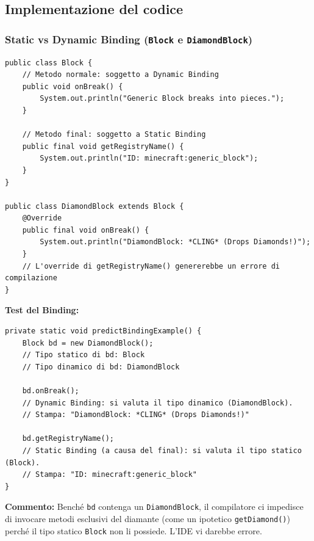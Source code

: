 \documentclass[12pt, a4paper]{article}
\begin{document}
\subsection{Implementazione del codice}

\subsubsection{Static vs Dynamic Binding (\texttt{Block} e \texttt{DiamondBlock})}
\begin{verbatim}
public class Block {
    // Metodo normale: soggetto a Dynamic Binding
    public void onBreak() {
        System.out.println("Generic Block breaks into pieces.");
    }
    
    // Metodo final: soggetto a Static Binding
    public final void getRegistryName() {
        System.out.println("ID: minecraft:generic_block");
    }
}

public class DiamondBlock extends Block {
    @Override
    public final void onBreak() {
        System.out.println("DiamondBlock: *CLING* (Drops Diamonds!)");
    }
    // L'override di getRegistryName() genererebbe un errore di compilazione
}
\end{verbatim}

\textbf{Test del Binding:}
\begin{verbatim}
private static void predictBindingExample() {
    Block bd = new DiamondBlock(); 
    // Tipo statico di bd: Block
    // Tipo dinamico di bd: DiamondBlock

    bd.onBreak(); 
    // Dynamic Binding: si valuta il tipo dinamico (DiamondBlock).
    // Stampa: "DiamondBlock: *CLING* (Drops Diamonds!)"

    bd.getRegistryName();
    // Static Binding (a causa del final): si valuta il tipo statico (Block).
    // Stampa: "ID: minecraft:generic_block"
}
\end{verbatim}
\textbf{Commento:} Benché \texttt{bd} contenga un \texttt{DiamondBlock}, il compilatore ci impedisce di invocare metodi esclusivi del diamante (come un ipotetico \texttt{getDiamond()}) perché il tipo statico \texttt{Block} non li possiede. L'IDE vi darebbe errore.

\newpage
\end{document}
